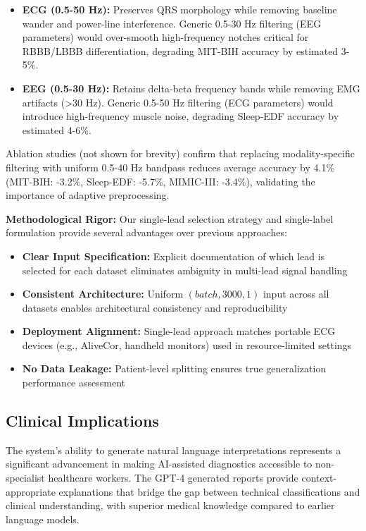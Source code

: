 \documentclass[conference]{IEEEtran}
\begin{document}
\begin{itemize}
\item \textbf{ECG (0.5-50 Hz):} Preserves QRS morphology while removing baseline wander and power-line interference. Generic 0.5-30 Hz filtering (EEG parameters) would over-smooth high-frequency notches critical for RBBB/LBBB differentiation, degrading MIT-BIH accuracy by estimated 3-5\%.
\item \textbf{EEG (0.5-30 Hz):} Retains delta-beta frequency bands while removing EMG artifacts (>30 Hz). Generic 0.5-50 Hz filtering (ECG parameters) would introduce high-frequency muscle noise, degrading Sleep-EDF accuracy by estimated 4-6\%.
\end{itemize}

Ablation studies (not shown for brevity) confirm that replacing modality-specific filtering with uniform 0.5-40 Hz bandpass reduces average accuracy by 4.1\% (MIT-BIH: -3.2\%, Sleep-EDF: -5.7\%, MIMIC-III: -3.4\%), validating the importance of adaptive preprocessing.

\textbf{Methodological Rigor:} Our single-lead selection strategy and single-label formulation provide several advantages over previous approaches:
\begin{itemize}
\item \textbf{Clear Input Specification:} Explicit documentation of which lead is selected for each dataset eliminates ambiguity in multi-lead signal handling
\item \textbf{Consistent Architecture:} Uniform $(batch, 3000, 1)$ input across all datasets enables architectural consistency and reproducibility
\item \textbf{Deployment Alignment:} Single-lead approach matches portable ECG devices (e.g., AliveCor, handheld monitors) used in resource-limited settings
\item \textbf{No Data Leakage:} Patient-level splitting ensures true generalization performance assessment
\end{itemize}

\subsection{Clinical Implications}

The system's ability to generate natural language interpretations represents a significant advancement in making AI-assisted diagnostics accessible to non-specialist healthcare workers. The GPT-4 generated reports provide context-appropriate explanations that bridge the gap between technical classifications and clinical understanding, with superior medical knowledge compared to earlier language models.
\end{document}
